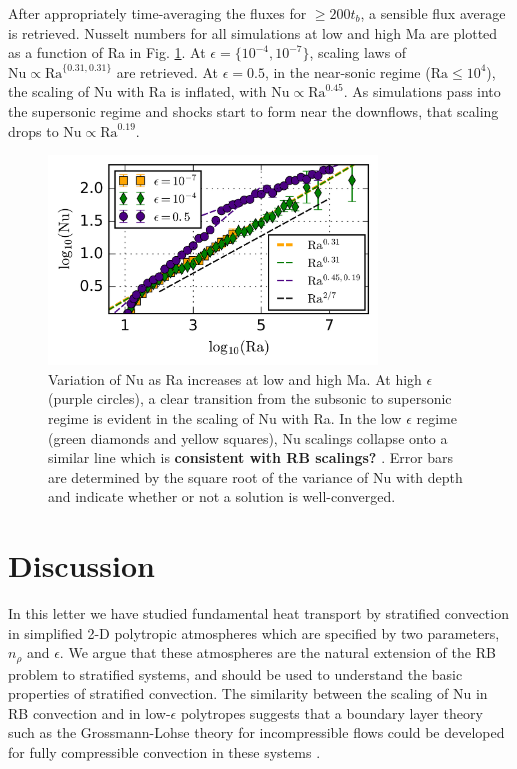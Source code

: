 \documentclass[aps, prl, twocolumn, nofootinbib, groupedaddress, amsfonts, amssymb, amsmath]{revtex4-1}
\newcommand{\nrho}{\ensuremath{n_{\rho}}}
\begin{document}
After appropriately time-averaging the fluxes for $\geq 200 t_b$, a sensible flux average is retrieved.  
Nusselt numbers for
all simulations at low and high Ma are plotted as a function of Ra in Fig. \ref{fig:nu_v_ra}.  
At $\epsilon = \{10^{-4}, 10^{-7}\}$,
scaling laws of $\text{Nu} \propto \text{Ra}^{\{0.31, 0.31\}}$ are retrieved.  At $\epsilon = 0.5$, in the near-sonic
regime ($\text{Ra} \leq 10^4$), the scaling of Nu with Ra is inflated, with $\text{Nu} \propto \text{Ra}^{0.45}$.  As simulations
pass into the supersonic regime and shocks start to form near the downflows,
that scaling drops to $\text{Nu} \propto \text{Ra}^{0.19}$.  

\begin{figure}[t]
\includegraphics[width=3.4375in]{./figs/nu_v_ra.png}
\caption{Variation of Nu as Ra increases at low and high Ma. 
At high $\epsilon$ (purple circles), 
a clear transition from the subsonic to supersonic regime is evident in the scaling
of Nu with Ra.  In the low $\epsilon$ regime (green diamonds and yellow squares), 
Nu scalings collapse onto a similar line which is
\textbf{consistent with RB scalings?} \cite{johnston&doering2009}.  Error bars are determined
 by the square root of the variance of Nu with depth and indicate whether or not a solution is well-converged.
\label{fig:nu_v_ra} }
\end{figure}

\section{Discussion}
\label{sec:discussion}
In this letter we have studied fundamental heat transport by stratified convection in simplified 2-D polytropic
atmospheres which are specified by two parameters, $\nrho$ 
and $\epsilon$.  We argue that these atmospheres are the natural extension
of the RB problem to stratified systems, and should be used to understand the basic properties of stratified
convection.  The similarity between the scaling of Nu in RB convection and in low-$\epsilon$ polytropes suggests 
that a boundary layer theory such as the Grossmann-Lohse theory for incompressible flows
could be developed for fully compressible convection in these systems \cite{ahlers&all2009}.  
\end{document}

